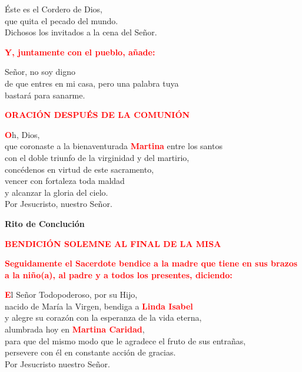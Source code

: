 \documentclass[12pt, letterpaper]{report}
\begin{document}
\Large \'Este es el Cordero de Dios,\\
que quita el pecado del mundo.\\
Dichosos los invitados a la cena del Se\~nor. \newline


\large{\bfseries \textcolor{red}{Y, juntamente con el pueblo, a\~nade:}}\newline

\Large Se\~nor, no soy digno\\
de que entres en mi casa,
pero una palabra tuya\\
bastar\'a para sanarme.\newline

\Large {\bfseries \textcolor{red}{ORACI\'ON DESPU\'ES DE LA COMUNI\'ON}}

\lettrine[lines=1]{\bfseries \textcolor{red}{O}}{}\Large h, Dios, \\
que coronaste a la bienaventurada {\bfseries \textcolor{red}{Martina}} entre los santos \\
con el doble triunfo de la virginidad y del martirio, \\
conc\'edenos en virtud de este sacramento, \\
vencer con fortaleza toda maldad \\
y alcanzar la gloria del cielo. \\
Por Jesucristo, nuestro Se\~nor.



\begin{center}
\Huge {\bfseries Rito de Concluci\'on}
\end{center}

\Large {\bfseries \textcolor{red}{BENDICI\'ON SOLEMNE AL FINAL DE LA MISA}} \newline

\large{\bfseries \textcolor{red}{Seguidamente el Sacerdote bendice a la madre que tiene en sus brazos a la ni\~no(a), al padre y a todos los presentes, diciendo:}}\newline

\lettrine[lines=1]{\bfseries \textcolor{red}{E}}{}\Large l Se\~nor Todopoderoso, por su Hijo, \\
nacido de Mar\'ia la Virgen, bendiga a {\bfseries \textcolor{red}{Linda Isabel}} \\
y alegre su coraz\'on con la esperanza de la vida eterna, \\
alumbrada hoy en {\bfseries \textcolor{red}{Martina Caridad}}, \\
para que del mismo modo que le agradece el fruto de sus entra\~nas, \\ persevere con \'el en constante acci\'on de gracias. \\
Por Jesucristo nuestro Se\~nor. \newline
\end{document}
